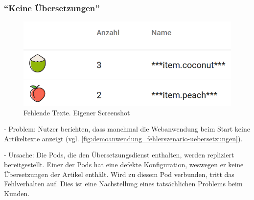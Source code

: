 \pagebreak

\subsubsection{\enquote{Keine Übersetzungen}}
\label{subsec:keine-uebersetzungen}

\begin{figure}
\centering
\vspace{-\baselineskip}
\includegraphics[width=\linewidth]{img/04_erstellung-poc/demoanwendung_fehlerszenario-uebersetzungen}
\caption{Fehlende Texte. Eigener Screenshot}
\label{fig:demoanwendung_fehlerszenario-uebersetzungen}
\end{figure}

- Problem: Nutzer berichten, dass manchmal die Webanwendung beim Start keine Artikeltexte anzeigt (vgl. \autoref{fig:demoanwendung_fehlerszenario-uebersetzungen}).

- Ursache: Die Pods, die den Übersetzungsdienst enthalten, werden repliziert bereitgestellt. Einer der Pods hat eine defekte Konfiguration, weswegen er keine Übersetzungen der Artikel enthält. Wird zu diesem Pod verbunden, tritt das Fehlverhalten auf. Dies ist eine Nachstellung eines tatsächlichen Problems beim Kunden.

%
%

%
%

